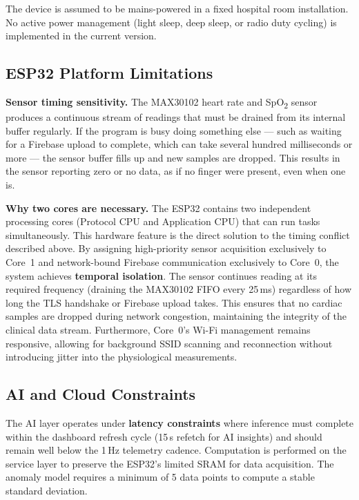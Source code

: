 The device is assumed to be mains-powered in a fixed hospital room installation.
No active power management (light sleep, deep sleep, or radio duty cycling) is
implemented in the current version.

\subsection*{ESP32 Platform Limitations}

\textbf{Sensor timing sensitivity.}
The MAX30102 heart rate and SpO\textsubscript{2} sensor produces a continuous stream
of readings that must be drained from its internal buffer regularly.
If the program is busy doing something else — such as waiting for a Firebase upload
to complete, which can take several hundred milliseconds or more — the sensor buffer
fills up and new samples are dropped.
This results in the sensor reporting zero or no data, as if no finger were present,
even when one is.

\textbf{Why two cores are necessary.}
The ESP32 contains two independent processing cores (Protocol CPU and Application CPU) that can run tasks simultaneously. This hardware feature is the direct solution to the timing conflict described above. By assigning high-priority sensor acquisition exclusively to Core~1 and network-bound Firebase communication exclusively to Core~0, the system achieves \textbf{temporal isolation}. The sensor continues reading at its required frequency (draining the MAX30102 FIFO every 25\,ms) regardless of how long the TLS handshake or Firebase upload takes. This ensures that no cardiac samples are dropped during network congestion, maintaining the integrity of the clinical data stream. Furthermore, Core~0's Wi-Fi management remains responsive, allowing for background SSID scanning and reconnection without introducing jitter into the physiological measurements.
\subsection*{AI and Cloud Constraints}

The AI layer operates under \textbf{latency constraints} where inference must complete within the dashboard refresh cycle (15\,s refetch for AI insights) and should remain well below the 1\,Hz telemetry cadence. Computation is performed on the service layer to preserve the ESP32's limited SRAM for data acquisition. The anomaly model requires a minimum of 5 data points to compute a stable standard deviation.

